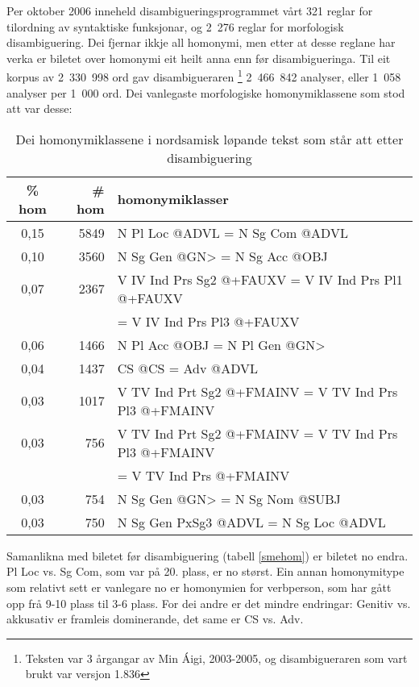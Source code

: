 \documentclass[a4paper,nynorsk]{article}
\begin{document}
Per oktober 2006 inneheld disambigueringsprogrammet vårt 321 reglar for tilordning av syntaktiske funksjonar, og 2\ 276 reglar for morfologisk disambiguering. Dei fjernar ikkje all homonymi, men etter at desse reglane har verka er biletet over homonymi eit heilt anna enn før disambigueringa. Til eit korpus av 2\ 330\ 998 ord gav disambigueraren \footnote{Teksten var 3 årgangar av Min Áigi, 2003-2005, og disambigueraren som vart brukt var versjon 1.836} 2\ 466\ 842 analyser, eller 1\ 058 analyser per 1\ 000 ord. Dei vanlegaste morfologiske homonymiklassene som stod att var desse:



\begin{table}[htdp]
\caption{Dei homonymiklassene i nordsamisk løpande tekst som står att etter disambiguering}
\begin{center}
\begin{tabular}{|c|r|l|}
\hline
\% hom & \# hom & homonymiklasser \\
\hline
0,15 & 5849 & N Pl Loc @ADVL = N Sg Com @ADVL \\ 
0,10 & 3560 & N Sg Gen @GN> = N Sg Acc @OBJ \\ 
0,07 & 2367 & V IV Ind Prs Sg2 @+FAUXV = V IV Ind Prs Pl1 @+FAUXV \\
     &      &  = V IV Ind Prs Pl3 @+FAUXV \\ 
0,06 & 1466 & N Pl Acc @OBJ = N Pl Gen @GN> \\ 
0,04 & 1437 & CS @CS = Adv @ADVL \\ 
0,03 & 1017 & V TV Ind Prt Sg2 @+FMAINV = V TV Ind Prs Pl3 @+FMAINV \\ 
0,03 & 756 & V TV Ind Prt Sg2 @+FMAINV = V TV Ind Prs Pl3 @+FMAINV \\
     &     &  = V TV Ind Prs @+FMAINV \\ 
0,03 & 754 & N Sg Gen @GN> = N Sg Nom @SUBJ \\ 
0,03 & 750 & N Sg Gen PxSg3 @ADVL = N Sg Loc @ADVL \\ 
\hline
\end{tabular}
\end{center}
\label{smedishom}
\end{table}%


Samanlikna med biletet før disambiguering (tabell \ref{smehom}) er biletet no endra. Pl Loc vs. Sg Com, som var på 20. plass, er no størst. Ein annan homonymitype som relativt sett er vanlegare no er homonymien for verbperson, som har gått opp frå 9-10 plass til 3-6 plass. For dei andre er det mindre endringar: Genitiv vs. akkusativ er framleis dominerande, det same er CS vs. Adv.
\end{document}
